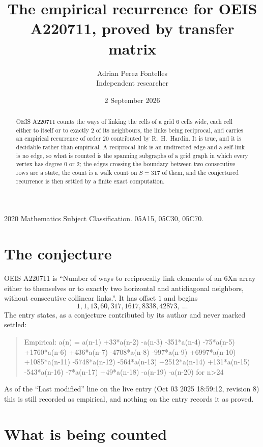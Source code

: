 \documentclass[11pt,a4paper]{article}
\title{The empirical recurrence for OEIS A220711, proved by transfer matrix}
\author{Adrian Perez Fontelles\\ \small Independent researcher}
\date{2 September 2026}
\theoremstyle{plain}
\theoremstyle{definition}
\begin{document}
\maketitle

\begin{abstract}
OEIS A220711 counts the ways of linking the cells of a grid $6$ cells wide, each cell either to
itself or to exactly $2$ of its neighbours, the links being reciprocal, and carries an
empirical recurrence of order $20$ contributed by R.~H.~Hardin. It is true, and it is
decidable rather than empirical. A reciprocal link is an undirected edge and a self-link is
no edge, so what is counted is the spanning subgraphs of a grid graph in which every vertex
has degree $0$ or $2$; the edges crossing the boundary between two consecutive rows are a
state, the count is a walk count on $S=317$ of them, and the conjectured recurrence is then
settled by a finite exact computation.
\end{abstract}

\noindent\small 2020 Mathematics Subject Classification. 05A15, 05C30, 05C70.\normalsize

\section{The conjecture}

OEIS A220711 is ``Number of ways to reciprocally link elements of an 6Xn array either to themselves or to exactly two horizontal and antidiagonal neighbors, without consecutive collinear links.''. It has offset $1$ and begins
\[
1, 1, 13, 60, 317, 1617, 8338, 42873,\ \dots
\]
The entry states, as a conjecture contributed by its author and never marked settled:
\begin{quote}
Empirical: a(n) = a(n-1) +33*a(n-2) -a(n-3) -351*a(n-4) -75*a(n-5) +1760*a(n-6) +436*a(n-7) -4708*a(n-8) -997*a(n-9) +6997*a(n-10) +1085*a(n-11) -5748*a(n-12) -564*a(n-13) +2512*a(n-14) +131*a(n-15) -543*a(n-16) -7*a(n-17) +49*a(n-18) -a(n-19) -a(n-20) for n>24
\end{quote}
As of the ``Last modified'' line on the live entry (Oct 03 2025 18:59:12, revision 8) this is still
recorded as empirical, and nothing on the entry records it as proved.

\section{What is being counted}
\end{document}
